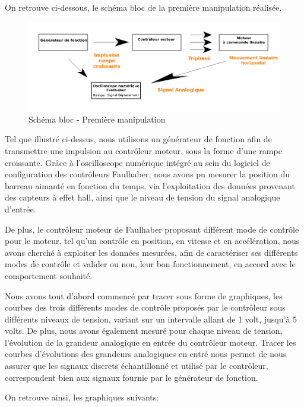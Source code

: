 \documentclass[french,a4paper,12pt]{report}
\begin{document}
	On retrouve ci-dessous, le schéma bloc de la première manipulation réalisée.
		
	\begin{figure}[!ht]
    \center
  	\includegraphics[width=18cm]{manip1.png}
    \caption{Schéma bloc - Première manipulation}
	\end{figure}	
		
		Tel que illustré ci-dessus, nous utilisons un générateur de fonction afin de transmettre une impulsion au contrôleur moteur, sous la forme d'une rampe croissante.
		Grâce à l'oscilloscope numérique intégré au sein du logiciel de configuration des contrôleurs Faulhaber, nous avons pu mesurer la position du barreau aimanté en fonction du temps, via l'exploitation des données provenant des capteurs à effet hall, ainsi que le niveau de tension du signal analogique d'entrée.
		
		De plus, le contrôleur moteur de Faulhaber proposant différent mode de contrôle pour le moteur, tel qu'un contrôle en position, en vitesse et en accélération, nous avons cherché à exploiter les données mesurées, afin de caractériser ses différents modes de contrôle et valider ou non, leur bon fonctionnement, en accord avec le comportement souhaité.
		
		Nous avons tout d'abord commencé par tracer sous forme de graphiques, les courbes des trois différents modes de contrôle proposés par le contrôleur sous différents niveaux de tension, variant sur un intervalle allant de 1 volt, jusqu'à 5 volts.
		De plus, nous avons également mesuré pour chaque niveau de tension, l'évolution de la grandeur analogique en entrée du contrôleur moteur. Tracer les courbes d'évolutions des grandeurs analogiques en entré nous permet de nous assurer que les signaux discrets échantillonné et utilisé par le contrôleur, correspondent bien aux signaux fournie par le générateur de fonction.
		
		On retrouve ainsi, les graphiques suivants:
		
\end{document}
